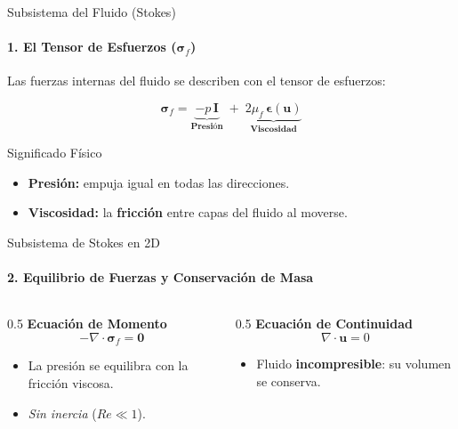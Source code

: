\begin{frame}{Subsistema del Fluido (Stokes)}
    \framesubtitle{1. El Tensor de Esfuerzos ($\boldsymbol{\sigma}_f$)}
    
    Las fuerzas internas del fluido se describen con el tensor de esfuerzos:

    \vspace{0.5cm}
    \begin{equation*}
        \boldsymbol{\sigma}_f =
        \underbrace{-p\,\mathbf{I}}_{\textbf{Presión}}
        \; + \;
        \underbrace{2\mu_f\,\boldsymbol{\epsilon}(\mathbf{u})}_{\textbf{Viscosidad}}
    \end{equation*}
    \vspace{0.5cm}

    \begin{block}{Significado Físico}
        \begin{itemize}
            \item \textbf{Presión:} empuja igual en todas las direcciones.
            \item \textbf{Viscosidad:} la \textbf{fricción} entre capas del fluido al moverse.
        \end{itemize}
    \end{block}
\end{frame}

\begin{frame}{Subsistema de Stokes en 2D}
    \framesubtitle{2. Equilibrio de Fuerzas y Conservación de Masa}
    
    \begin{columns}[T]
        \begin{column}{0.5\textwidth}
            \textbf{Ecuación de Momento}
            \begin{equation*}
                -\nabla \cdot \boldsymbol{\sigma}_f = \mathbf{0}
            \end{equation*}
            \begin{itemize}
                \item La presión se equilibra con la fricción viscosa.
                \item \textit{Sin inercia} ($Re \ll 1$).
            \end{itemize}
        \end{column}

        \begin{column}{0.5\textwidth}
            \textbf{Ecuación de Continuidad}
            \begin{equation*}
                \nabla \cdot \mathbf{u} = 0
            \end{equation*}
            \begin{itemize}
                \item Fluido \textbf{incompresible}: su volumen se conserva.
            \end{itemize}
        \end{column}
    \end{columns}
\end{frame}


